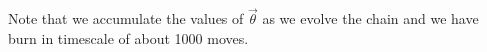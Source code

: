 Note that we accumulate the values of $\vec{\theta}$ as we evolve the chain and we have burn in timescale of about 1000 moves.

%





